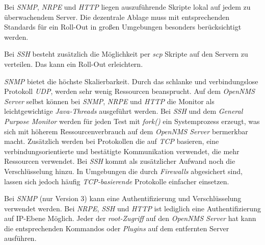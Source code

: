 Bei \emph{SNMP}, \emph{NRPE} und \emph{HTTP} liegen auszuführende Skripte lokal auf jedem zu überwachendem Server. Die dezentrale Ablage muss mit entsprechenden Standards für ein Roll-Out in großen Umgebungen besonders berücksichtigt werden.

Bei \emph{SSH} besteht zusätzlich die Möglichkeit per \emph{scp} Skripte auf den Servern zu verteilen. Das kann ein Roll-Out erleichtern.

\emph{SNMP} bietet die höchste Skalierbarkeit. Durch das schlanke und verbindungslose Protokoll \emph{UDP}, werden sehr wenig Ressourcen beansprucht. Auf dem \emph{OpenNMS Server} selbst können bei \emph{SNMP}, \emph{NRPE} und \emph{HTTP} die Monitor als leichtgewichtige \emph{Java-Threads} ausgeführt werden. 
Bei \emph{SSH} und dem \emph{General Purpose Monitor} werden für jeden Test mit \emph{fork()} ein Systemprozess erzeugt, was sich mit höherem Ressourcenverbrauch auf dem \emph{OpenNMS Server} bermerkbar macht. Zusätzlich werden bei Protokollen die auf \emph{TCP} basieren, eine verbindungsorientierte und bestätigte Kommunikation verwendet, die mehr Ressourcen verwendet. Bei \emph{SSH} kommt als zusätzlicher Aufwand noch die Verschlüsselung hinzu. In Umgebungen die durch \emph{Firewalls} abgesichert sind, lassen sich jedoch häufig \emph{TCP-basierende} Protokolle einfacher einsetzen.

Bei \emph{SNMP} (nur Version 3) kann eine Authentifizierung und Verschlüsselung verwendet werden. Bei \emph{NRPE}, \emph{SSH} und \emph{HTTP} ist lediglich eine Authentifizierung auf IP-Ebene Möglich. Jeder der \emph{root-Zugriff} auf den \emph{OpenNMS Server} hat kann die entsprechenden Kommandos oder \emph{Plugins} auf dem entfernten Server ausführen.

